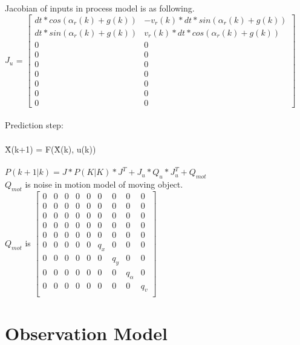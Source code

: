 \documentclass[11pt,a4paper]{article}
\begin{document}
Jacobian of inputs in process model is as following.
\\


\noindent $J_{u}$ = $\begin{bmatrix}   dt*cos(\alpha_{r}(k) + g(k)) & -v_{r}(k)*dt*sin(\alpha_{r}(k) + g(k))  \\
						           dt*sin(\alpha_{r}(k) + g(k)) &  v_{r}(k)*dt*cos(\alpha_{r}(k) + g(k)) \\
						0  &  0   \\
						0  &  0  \\
						0  &  0  \\
						0  &  0  \\
						0  &  0  \\
						0  &  0  \\
						0  &  0   
\end{bmatrix} $
\\
\\


\noindent Prediction step:
\\
\\
\^{X(k+1)} = F(\^{X(k)}, u(k))
\\
\\
\noindent $P(k+1|k) = J*P(K|K)*J^{T} + J_{u}*Q_{u}*J_{u}^{T} + Q_{mot}$
\\

\noindent $Q_{mot}$ is noise in motion model of moving object.
\\
$Q_{mot}$ is $\begin{bmatrix}  0  &  0  &  0  &  0  &  0  &  0  &  0 &  0 &  0 \\
						     0  &  0  &  0  &  0  &  0  &  0  &  0 &  0 &  0 \\
						     0  &  0  &  0  &  0  &  0  &  0  &  0 &  0 &  0 \\
							 0  &  0  &  0  &  0  &  0  &  0  &  0 &  0 &  0 \\
							 0  &  0  &  0  &  0  &  0  &  0  &  0 &  0 &  0 \\
						 	 0  &  0  &  0  &  0  &  0  &  q_{x}  &  0 &  0 &  0 \\
							 0  &  0  &  0  &  0  &  0  &  0  &  q_{y} &  0 &  0 \\
							 0  &  0  &  0  &  0  &  0  &  0  &  0 &  q_{\alpha} &  0 \\
							 0  &  0  &  0  &  0  &  0  &  0  &  0 &  0 &  q_{v} \\
\end{bmatrix}$

   
\section{Observation Model}
\end{document}
